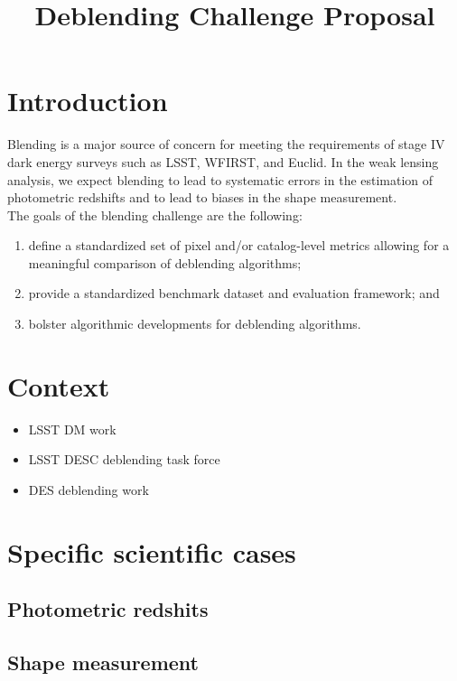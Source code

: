 \documentclass[10pt,letter]{article}
\title{\vspace{-2em} Deblending Challenge Proposal}
\author{}
\date{}
\begin{document}
\maketitle

\section*{Introduction}

Blending is a major source of concern for meeting the requirements of stage IV dark energy surveys such as LSST, WFIRST, and Euclid. In the weak lensing analysis, we expect blending to lead to systematic errors in the estimation of photometric redshifts and to lead to biases in the shape measurement.\\

\noindent The goals of the blending challenge are the following:
\begin{enumerate}
    \item define a standardized set of pixel and/or catalog-level metrics allowing for a meaningful comparison of deblending algorithms;
    \item provide a standardized benchmark dataset and evaluation framework; and
    \item bolster algorithmic developments for deblending algorithms.
\end{enumerate}

\section{Context}

\begin{itemize}
    \item LSST DM work
    \item LSST DESC deblending task force
    \item DES deblending work
\end{itemize}

\section{Specific scientific cases}

\subsection{Photometric redshits}

\subsection{Shape measurement}
\end{document}
